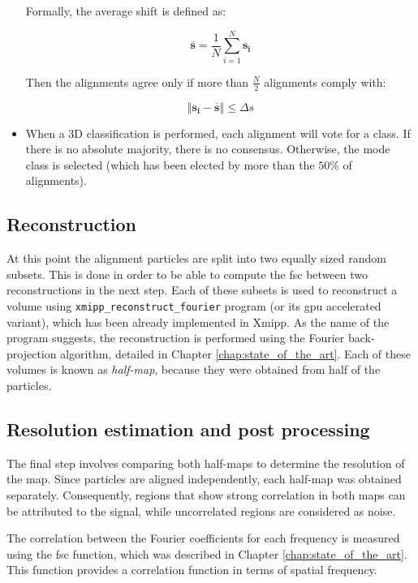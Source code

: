 \documentclass[../main.tex]{subfiles}
\begin{document}
\begin{itemize}
    Formally, the average shift is defined as:

    \begin{equation}
        \overline{\bm{s}} = \frac{1}{N} \sum_{i=1}^{N} \bm{s_i}
    \end{equation}

    Then the alignments agree only if more than $\frac{N}{2}$ alignments comply with:

    \begin{equation}
        \left\Vert \bm{s_i} - \overline{\bm{s}}  \right\Vert \leq \Delta s
    \end{equation}

    \item When a 3D classification is performed, each alignment will vote for a class. If there is no absolute majority, there is no consensus. Otherwise, the mode class is selected (which has been elected by more than the $50 \si{\percent}$ of alignments).
    
\end{itemize}

\subsection{Reconstruction}
At this point the alignment particles are split into two equally sized random subsets. This is done in order to be able to compute the \gls{fsc} between two reconstructions in the next step. Each of these subsets is used to reconstruct a volume using \texttt{xmipp\_reconstruct\_fourier} program (or its \gls{gpu} accelerated variant\cite{strelak2019}), which has been already implemented in Xmipp. As the name of the program suggests, the reconstruction is performed using the Fourier back-projection algorithm, detailed in Chapter \ref{chap:state_of_the_art}. Each of these volumes is known as \textit{half-map}, because they were obtained from half of the particles.

\subsection{Resolution estimation and post processing}
The final step involves comparing both half-maps to determine the resolution of the map. Since particles are aligned independently, each half-map was obtained separately. Consequently, regions that show strong correlation in both maps can be attributed to the signal, while uncorrelated regions are considered as noise.

The correlation between the Fourier coefficients for each frequency is measured using the \gls{fsc} function, which was described in Chapter \ref{chap:state_of_the_art}. This function provides a correlation function in terms of spatial frequency.
\end{document}
